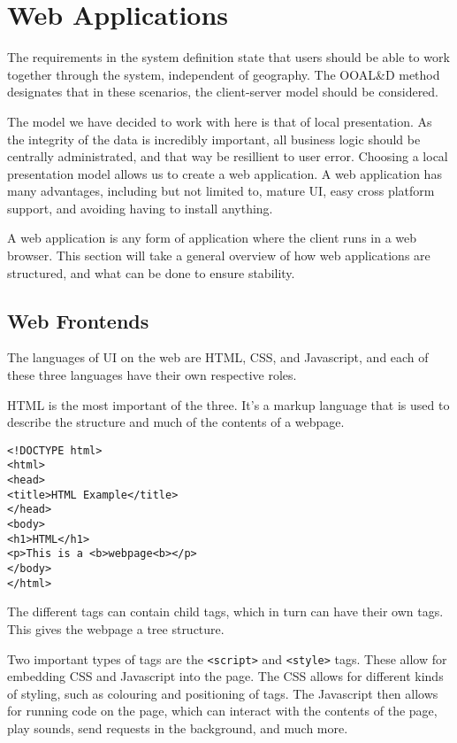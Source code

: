 \section{Web Applications}
The requirements in the system definition state that users should be able to work together through the system, independent of geography.
The OOAL\&D method designates that in these scenarios, the client-server model should be considered.

The model we have decided to work with here is that of local presentation.
As the integrity of the data is incredibly important, all business logic should be centrally administrated, and that way be resillient to user error.
Choosing a local presentation model allows us to create a web application.
A web application has many advantages, including but not limited to, mature UI, easy cross platform support, and avoiding having to install anything.

A web application is any form of application where the client runs in a web browser.
This section will take a general overview of how web applications are structured, and what can be done to ensure stability.


\subsection{Web Frontends}
The languages of UI on the web are HTML, CSS, and Javascript, and each of these three languages have their own respective roles.\cite{nixonweb}

HTML is the most important of the three. It's a markup language that is used to describe the structure and much of the contents of a webpage.
\begin{lstlisting}
<!DOCTYPE html>
<html>
<head>
<title>HTML Example</title>
</head>
<body>
<h1>HTML</h1>
<p>This is a <b>webpage<b></p>
</body>
</html>
\end{lstlisting}
The different tags can contain child tags, which in turn can have their own tags. This gives the webpage a tree structure.

Two important types of tags are the \texttt{<script>} and \texttt{<style>} tags. These allow for embedding CSS and Javascript into the page. The CSS allows for different kinds of styling, such as colouring and positioning of tags. The Javascript then allows for running code on the page, which can interact with the contents of the page, play sounds, send requests in the background, and much more.\cite{nixonweb}

